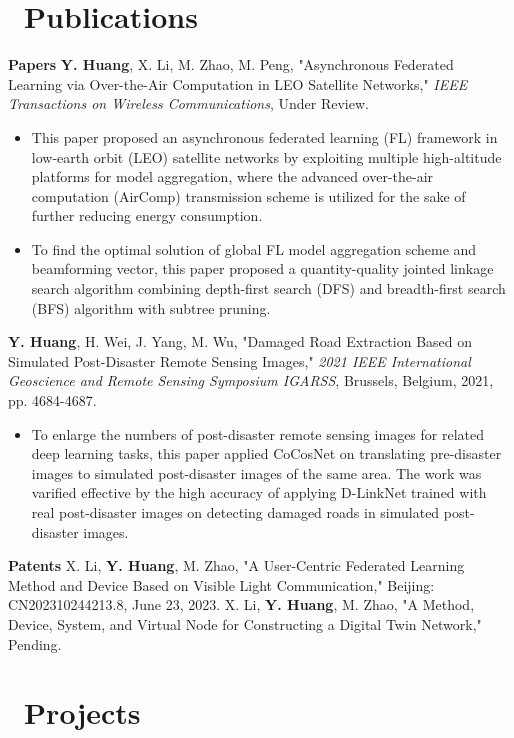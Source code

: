 \documentclass{resume}
\begin{document}
\section{\faBook\ Publications}
\textbf{Papers} \newline
\textbf{Y. Huang}, X. Li, M. Zhao, M. Peng, "Asynchronous Federated Learning via Over-the-Air Computation in LEO Satellite Networks," \textit{IEEE Transactions on Wireless Communications}, Under Review.
\begin{itemize}
  \item This paper proposed an asynchronous federated learning (FL) framework in low-earth orbit (LEO) satellite networks by exploiting multiple high-altitude platforms for model aggregation, where the advanced over-the-air computation (AirComp) transmission scheme is utilized for the sake of further reducing energy consumption.
  \item To find the optimal solution of global FL model aggregation scheme and beamforming vector, this paper proposed a quantity-quality jointed linkage search algorithm combining depth-first search (DFS) and breadth-first search (BFS) algorithm with subtree pruning.
\end{itemize}
\textbf{Y. Huang}, H. Wei, J. Yang, M. Wu, "Damaged Road Extraction Based on Simulated Post-Disaster Remote Sensing Images," \textit{2021 IEEE International Geoscience and Remote Sensing Symposium IGARSS}, Brussels, Belgium, 2021, pp. 4684-4687.
\begin{itemize}
  \item To enlarge the numbers of post-disaster remote sensing images for related deep learning tasks, this paper applied CoCosNet on translating pre-disaster images to simulated post-disaster images of the same area. The work was varified effective by the high accuracy of applying D-LinkNet trained with real post-disaster images on detecting damaged roads in simulated post-disaster images. 
\end{itemize}

\textbf{Patents} \newline
X. Li, \textbf{Y. Huang}, M. Zhao, "A User-Centric Federated Learning Method and Device Based on Visible Light Communication," Beijing: CN202310244213.8, June 23, 2023. \newline
X. Li, \textbf{Y. Huang}, M. Zhao, "A Method, Device, System, and Virtual Node for Constructing a Digital Twin Network," Pending.



\section{\faTasks\ Projects}
\end{document}
